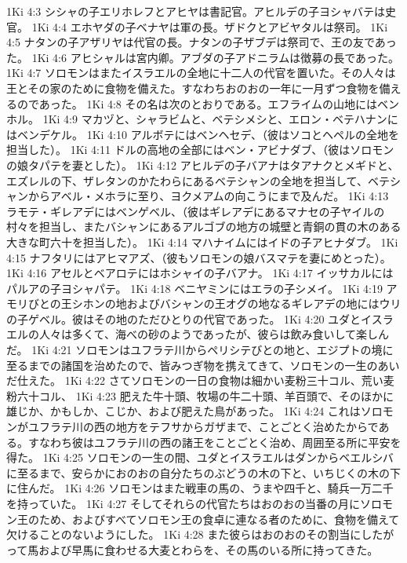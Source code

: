 1Ki 4:3  シシャの子エリホレフとアヒヤは書記官。アヒルデの子ヨシャバテは史官。
1Ki 4:4  エホヤダの子ベナヤは軍の長。ザドクとアビヤタルは祭司。
1Ki 4:5  ナタンの子アザリヤは代官の長。ナタンの子ザブデは祭司で、王の友であった。
1Ki 4:6  アヒシャルは宮内卿。アブダの子アドニラムは徴募の長であった。
1Ki 4:7  ソロモンはまたイスラエルの全地に十二人の代官を置いた。その人々は王とその家のために食物を備えた。すなわちおのおの一年に一月ずつ食物を備えるのであった。
1Ki 4:8  その名は次のとおりである。エフライムの山地にはベンホル。
1Ki 4:9  マカヅと、シャラビムと、ベテシメシと、エロン・ベテハナンにはベンデケル。
1Ki 4:10  アルボテにはベンヘセデ、（彼はソコとヘペルの全地を担当した）。
1Ki 4:11  ドルの高地の全部にはベン・アビナダブ、（彼はソロモンの娘タパテを妻とした）。
1Ki 4:12  アヒルデの子バアナはタアナクとメギドと、エズレルの下、ザレタンのかたわらにあるベテシャンの全地を担当して、ベテシャンからアベル・メホラに至り、ヨクメアムの向こうにまで及んだ。
1Ki 4:13  ラモテ・ギレアデにはベンゲベル、（彼はギレアデにあるマナセの子ヤイルの村々を担当し、またバシャンにあるアルゴブの地方の城壁と青銅の貫の木のある大きな町六十を担当した）。
1Ki 4:14  マハナイムにはイドの子アヒナダブ。
1Ki 4:15  ナフタリにはアヒマアズ、（彼もソロモンの娘バスマテを妻にめとった）。
1Ki 4:16  アセルとベアロテにはホシャイの子バアナ。
1Ki 4:17  イッサカルにはパルアの子ヨシャパテ。
1Ki 4:18  ベニヤミンにはエラの子シメイ。
1Ki 4:19  アモリびとの王シホンの地およびバシャンの王オグの地なるギレアデの地にはウリの子ゲベル。彼はその地のただひとりの代官であった。
1Ki 4:20  ユダとイスラエルの人々は多くて、海べの砂のようであったが、彼らは飲み食いして楽しんだ。
1Ki 4:21  ソロモンはユフラテ川からペリシテびとの地と、エジプトの境に至るまでの諸国を治めたので、皆みつぎ物を携えてきて、ソロモンの一生のあいだ仕えた。
1Ki 4:22  さてソロモンの一日の食物は細かい麦粉三十コル、荒い麦粉六十コル、
1Ki 4:23  肥えた牛十頭、牧場の牛二十頭、羊百頭で、そのほかに雄じか、かもしか、こじか、および肥えた鳥があった。
1Ki 4:24  これはソロモンがユフラテ川の西の地方をテフサからガザまで、ことごとく治めたからである。すなわち彼はユフラテ川の西の諸王をことごとく治め、周囲至る所に平安を得た。
1Ki 4:25  ソロモンの一生の間、ユダとイスラエルはダンからベエルシバに至るまで、安らかにおのおの自分たちのぶどうの木の下と、いちじくの木の下に住んだ。
1Ki 4:26  ソロモンはまた戦車の馬の、うまや四千と、騎兵一万二千を持っていた。
1Ki 4:27  そしてそれらの代官たちはおのおの当番の月にソロモン王のため、およびすべてソロモン王の食卓に連なる者のために、食物を備えて欠けることのないようにした。
1Ki 4:28  また彼らはおのおのその割当にしたがって馬および早馬に食わせる大麦とわらを、その馬のいる所に持ってきた。

